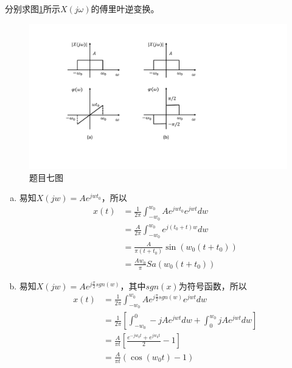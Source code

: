 \documentclass[answers]{exam}  %
\begin{document}
\begin{questions}
\question 分别求图\ref{fig:10}所示$X(j\omega)$的傅里叶逆变换。
\begin{figure}
	\centering
	\includegraphics[width=\linewidth]{pics/dsp2-8.pdf}
	\caption{题目七图}
	\label{fig:10}
\end{figure}

\begin{solution}
	\begin{enumerate}[(a)]
		\item 易知$X(jw)=Ae^{jwt_0}$，所以\begin{align*}
			x(t)&=\frac{1}{2\pi}\int_{-w_0}^{w_0}Ae^{jwt_0}e^{jwt}dw\\
			&=\frac{A}{2\pi}\int_{-w_0}^{w_0}e^{j(t_0+t)w}dw\\
			&=\frac{A}{\pi(t+t_0)}\sin(w_0(t+t_0))\\
			&=\frac{Aw_0}{\pi}Sa(w_0(t+t_0))
		\end{align*}
	    \item 易知$X(jw)=Ae^{j\frac{\pi}{2}sgn(w)}$，其中$sgn(x)$为符号函数，所以\begin{align*}
	    	x(t)&=\frac{1}{2\pi}\int_{-w_0}^{w_0}Ae^{j\frac{\pi}{2}sgn(w)}e^{jwt}dw\\
	    	&=\frac{1}{2\pi}[\int_{-w_0}^{0}-jAe^{jwt}dw+\int_{0}^{w_0}jAe^{jwt}dw]\\
	    	&=\frac{A}{\pi t}[\frac{e^{-jw_0t}+e^{jw_0t}}{2}-1]\\
	    	&=\frac{A}{\pi t}(\cos(w_0t)-1)
	    	\end{align*}
	\end{enumerate}
\end{solution}



\end{questions}
\end{document}
